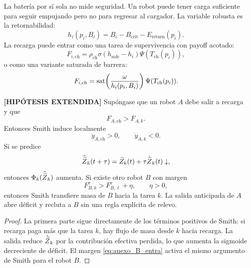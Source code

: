 La batería por sí sola no mide seguridad. Un robot puede tener carga suficiente para
seguir empujando pero no para regresar al cargador. La variable robusta es la
retornabilidad:
\begin{equation}
  h_i(p_i,B_i)=
  B_i-B_{\mathrm{crit}}-E_{\mathrm{return}}(p_i).
  \label{eq:anexo_retornabilidad}
\end{equation}
La recarga puede entrar como una tarea de supervivencia con payoff acotado:
\begin{equation}
  F_{i,\mathrm{ch}}
  =
  \rho_{\mathrm{ch}}
  \sigma(h_{\mathrm{safe}}-h_i)
  \Psi(T_{\mathrm{ch}}(p_i)),
  \label{eq:anexo_payoff_recarga_sigmoidal}
\end{equation}
o como una variante saturada de barrera:
\begin{equation}
  F_{i,\mathrm{ch}}
  =
  \operatorname{sat}\!\left(\frac{\omega}{h_i(p_i,B_i)}\right)
  \Psi(T_{\mathrm{ch}}(p_i)).
  \label{eq:anexo_payoff_recarga_barrera}
\end{equation}

\begin{proposicion}
\textbf{[HIPÓTESIS EXTENDIDA]}
Supóngase que un robot $A$ debe salir a recarga y que
\[
  F_{A,\mathrm{ch}}>F_{A,k}.
  \label{eq:anexo_A_sale}
\]
Entonces Smith induce localmente
\[
  \dot y_{A,\mathrm{ch}}>0,
  \qquad
  \dot y_{A,k}<0.
  \label{eq:anexo_smith_recarga}
\]
Si se predice
\begin{equation}
  \widehat{\widetilde{Z}}_k(t+\tau)
  =
  \widetilde{Z}_k(t)+\tau\dot{\widetilde{Z}}_k(t)
  \downarrow,
  \label{eq:anexo_deficit_anticipado}
\end{equation}
entonces $\Phi_k(\widehat{\widetilde{Z}}_k)$ aumenta. Si existe otro robot $B$ con margen
\begin{equation}
  F_{B,k}^{\tau}>F_{B,\ell}^{\tau}+\eta,
  \qquad \eta>0,
  \label{eq:anexo_B_entra}
\end{equation}
entonces Smith transfiere masa de $B$ hacia la tarea $k$. La salida anticipada de $A$
abre déficit y recluta a $B$ sin una regla explícita de relevo.
\end{proposicion}

\begin{proof}
La primera parte sigue directamente de los términos positivos de Smith: si recarga paga
más que la tarea $k$, hay flujo de masa desde $k$ hacia recarga. La salida reduce
$\dot{\widetilde{Z}}_k$ por la contribución efectiva perdida, lo que aumenta la sigmoide
decreciente de déficit. El margen \eqref{eq:anexo_B_entra} activa el mismo argumento de
Smith para el robot $B$.
\end{proof}

